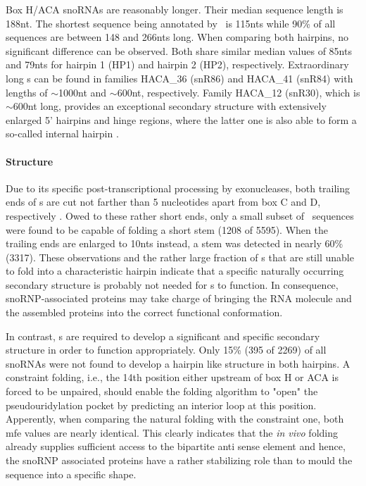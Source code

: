 Box H/ACA snoRNAs are reasonably longer. Their
median sequence length is 188nt. The shortest sequence being 
annotated by \snostrip\ is 115nts while 90\% of all
sequences are between 148 and 266nts long. When comparing both
hairpins, no significant difference can be observed. Both share
similar median values of 85nts and 79nts for hairpin 1 (HP1) and
hairpin 2 (HP2), respectively. Extraordinary
long \sno s can be found in families HACA\_36 (snR86) and HACA\_41
(snR84) with lengths of $\sim$1000nt and $\sim$600nt,
respectively. Family HACA\_12 (snR30), which is $\sim$600nt long,
provides an exceptional secondary structure with extensively enlarged
5' hairpins and hinge regions, where the latter one is also able to
form a so-called internal hairpin \citep{Fayet-Lebaron:2009}. 

\paragraph{\textbf{Structure}} Due to its specific
post-transcriptional processing by exonucleases, both trailing ends of
\cd s are cut not farther than 5 nucleotides apart from box C and D,
respectively \citep{Kishore:2013}. Owed to these rather short ends,
only a small subset of \sno\ sequences were found to be capable of
folding a short stem (1208 of 5595). When the trailing ends are
enlarged to 10nts instead, a stem was detected in nearly 60\%
(3317). These observations and the rather large fraction of \sno s
that are still unable to fold into a characteristic hairpin indicate
that a specific naturally occurring secondary structure is probably
not needed for \cd s to function. In consequence, snoRNP-associated
proteins may take charge of bringing the RNA molecule and the
assembled proteins into the correct functional conformation.

In contrast, \haca s are required to develop a
significant and specific secondary structure in order to function
appropriately. Only 15\% (395 of
2269) of all snoRNAs were not found to develop a hairpin like
structure in both hairpins. 
A constraint folding, i.e., the 14th position either
upstream of box H or ACA is forced to be unpaired, should enable the
folding algorithm to "open" the pseudouridylation pocket by predicting
an interior loop at this position. Apperently, when comparing the
natural folding with the constraint one, both mfe values are nearly
identical. This clearly indicates that the \textit{in vivo} folding
already supplies sufficient access to the bipartite anti sense element
and hence, the snoRNP associated proteins have a rather stabilizing
role than to mould the sequence into a specific shape.


